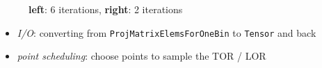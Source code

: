 \documentclass{beamer}
\begin{document}
\begin{frame}
  \frametitle{}
  \begin{figure}
    \centering
      \caption{\textbf{left}: 6 iterations, \textbf{right}: 2 iterations}
  \end{figure}

  \begin{itemize}
    \item \textsl{I/O}: converting from \texttt{ProjMatrixElemsForOneBin} to \texttt{Tensor} and back
    \item \textsl{point scheduling}: choose points to sample the TOR / LOR
  \end{itemize}
\end{frame}
\end{document}
